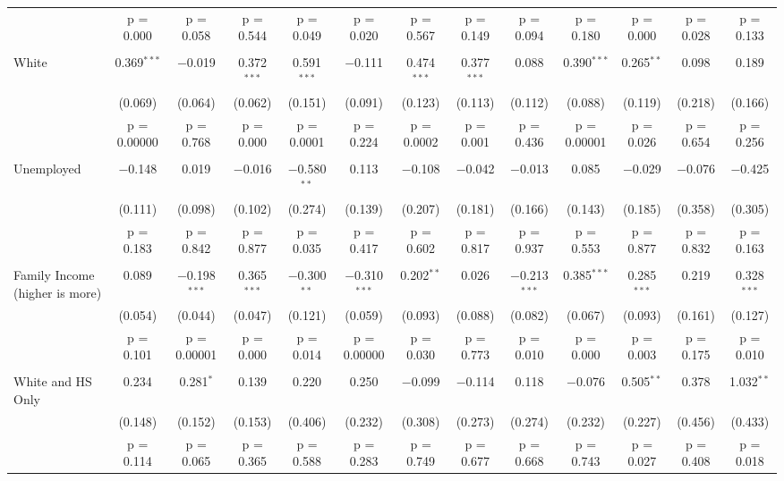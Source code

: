\documentclass{article}
\begin{document}
\begin{landscape}
\begin{longtable}{@{\extracolsep{5pt}}lcccccccccccc}
  & p = 0.000 & p = 0.058 & p = 0.544 & p = 0.049 & p = 0.020 & p = 0.567 & p = 0.149 & p = 0.094 & p = 0.180 & p = 0.000 & p = 0.028 & p = 0.133 \\ 
  & & & & & & & & & & & & \\ 
 White & 0.369$^{***}$ & $-$0.019 & 0.372$^{***}$ & 0.591$^{***}$ & $-$0.111 & 0.474$^{***}$ & 0.377$^{***}$ & 0.088 & 0.390$^{***}$ & 0.265$^{**}$ & 0.098 & 0.189 \\ 
  & (0.069) & (0.064) & (0.062) & (0.151) & (0.091) & (0.123) & (0.113) & (0.112) & (0.088) & (0.119) & (0.218) & (0.166) \\ 
  & p = 0.00000 & p = 0.768 & p = 0.000 & p = 0.0001 & p = 0.224 & p = 0.0002 & p = 0.001 & p = 0.436 & p = 0.00001 & p = 0.026 & p = 0.654 & p = 0.256 \\ 
  & & & & & & & & & & & & \\ 
 Unemployed & $-$0.148 & 0.019 & $-$0.016 & $-$0.580$^{**}$ & 0.113 & $-$0.108 & $-$0.042 & $-$0.013 & 0.085 & $-$0.029 & $-$0.076 & $-$0.425 \\ 
  & (0.111) & (0.098) & (0.102) & (0.274) & (0.139) & (0.207) & (0.181) & (0.166) & (0.143) & (0.185) & (0.358) & (0.305) \\ 
  & p = 0.183 & p = 0.842 & p = 0.877 & p = 0.035 & p = 0.417 & p = 0.602 & p = 0.817 & p = 0.937 & p = 0.553 & p = 0.877 & p = 0.832 & p = 0.163 \\ 
  & & & & & & & & & & & & \\ 
 Family Income (higher is more) & 0.089 & $-$0.198$^{***}$ & 0.365$^{***}$ & $-$0.300$^{**}$ & $-$0.310$^{***}$ & 0.202$^{**}$ & 0.026 & $-$0.213$^{***}$ & 0.385$^{***}$ & 0.285$^{***}$ & 0.219 & 0.328$^{***}$ \\ 
  & (0.054) & (0.044) & (0.047) & (0.121) & (0.059) & (0.093) & (0.088) & (0.082) & (0.067) & (0.093) & (0.161) & (0.127) \\ 
  & p = 0.101 & p = 0.00001 & p = 0.000 & p = 0.014 & p = 0.00000 & p = 0.030 & p = 0.773 & p = 0.010 & p = 0.000 & p = 0.003 & p = 0.175 & p = 0.010 \\ 
  & & & & & & & & & & & & \\ 
 White and HS Only & 0.234 & 0.281$^{*}$ & 0.139 & 0.220 & 0.250 & $-$0.099 & $-$0.114 & 0.118 & $-$0.076 & 0.505$^{**}$ & 0.378 & 1.032$^{**}$ \\ 
  & (0.148) & (0.152) & (0.153) & (0.406) & (0.232) & (0.308) & (0.273) & (0.274) & (0.232) & (0.227) & (0.456) & (0.433) \\ 
  & p = 0.114 & p = 0.065 & p = 0.365 & p = 0.588 & p = 0.283 & p = 0.749 & p = 0.677 & p = 0.668 & p = 0.743 & p = 0.027 & p = 0.408 & p = 0.018 \\ 

\end{longtable}
\end{landscape}
\end{document}
